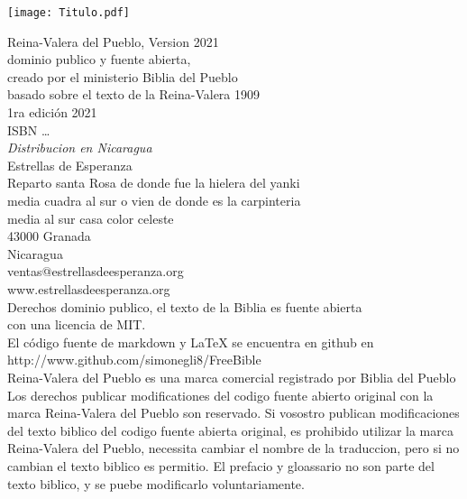 \documentclass[10pt, b5paper, twoside]{extbook}
\begin{document}


\null\vfill
\begin{center}
\begin{minipage}[c]{\textwidth}
  \begin{center}
  \texttt{[image: Titulo.pdf]}
  \end{center}
\end{minipage}
\end{center}
\newpage

\null\vfill
\noindent
Reina-Valera del Pueblo, Version 2021\\
dominio publico y fuente abierta,\\
creado por el ministerio Biblia del Pueblo\\
basado sobre el texto de la Reina-Valera 1909\\

\noindent
1ra edición 2021\\

\noindent
ISBN \dots\\

\noindent
\emph{Distribucion en Nicaragua}\\
Estrellas de Esperanza\\
Reparto santa Rosa de donde fue la hielera del yanki\\
media cuadra al sur o vien de donde es la carpinteria\\
media al sur casa color celeste\\
43000 Granada\\
Nicaragua\\
ventas@estrellasdeesperanza.org\\
www.estrellasdeesperanza.org\\

\noindent
Derechos dominio publico, el texto de la Biblia es fuente abierta\\
con una licencia de MIT.\\
El código fuente de markdown y LaTeX se encuentra en github en\\
http://www.github.com/simonegli8/FreeBible\\
Reina-Valera del Pueblo es una marca comercial registrado por Biblia del Pueblo\\
Los derechos publicar modificationes del codigo fuente abierto original con la marca Reina-Valera del Pueblo
son reservado. Si vosostro publican modificaciones del texto biblico del codigo fuente abierta original, es prohibido
utilizar la marca Reina-Valera del Pueblo, necessita cambiar el nombre de la traduccion, pero si no cambian el texto biblico es permitio. El prefacio y gloassario no son parte
del texto biblico, y se puebe modificarlo voluntariamente.\\
\end{document}
